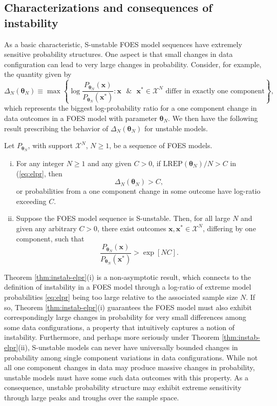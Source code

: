\documentclass[]{article}
\theoremstyle{definition}
\newcommand{\REP}{\mathrm{LREP}}
\newcommand{\DN}{\Delta_N}
\let\BeginKnitrBlock\begin \let\EndKnitrBlock\end
\begin{document}
\subsection{Characterizations and consequences of
instability}\label{characterizations-and-consequences-of-instability}

As a basic characteristic, S-unstable FOES model sequences have
extremely sensitive probability structures. One aspect is that small
changes in data configuration can lead to very large changes in
probability. Consider, for example, the quantity given by \[
\DN(\boldsymbol \theta_N) \equiv \max \left\{\log \frac{P_{\boldsymbol \theta_N}(\boldsymbol x)}{P_{\boldsymbol \theta_N}(\boldsymbol x^*)} : \boldsymbol x \text{ }\& \text{ } \boldsymbol x^* \in \mathcal{X}^N \text{ differ in exactly one component}\right\},
\] which represents the biggest log-probability ratio for a one
component change in data outcomes in a FOES model with parameter
\(\boldsymbol \theta_N\). We then have the following result prescribing
the behavior of \(\DN(\boldsymbol \theta_N)\) for unstable models.

\BeginKnitrBlock{theorem}
\protect\hypertarget{thm:instab-elpr}{}{\label{thm:instab-elpr}}Let
\(P_{\boldsymbol \theta_N}\), with support \(\mathcal{X}^N\),
\(N\geq 1\), be a sequence of FOES models.
\begin{enumerate}[(i)]
\item For any integer $N \geq 1$ and any given $C>0$, if $\REP(\boldsymbol \theta_N)/N > C$ in (\ref{eq:elpr}, then
    $$ \DN(\boldsymbol \theta_N) > C,$$
    or probabilities from a one component change in some outcome have log-ratio exceeding $C$.
\item Suppose the FOES model sequence is S-unstable. Then, for all large $N$ and given any arbitrary $C>0$, there exist outcomes $\boldsymbol x,\boldsymbol x^*\in\mathcal{X}^N$, differing by one component, such that
    $$
    \frac{P_{\boldsymbol \theta_N}(\boldsymbol x)}{P_{\boldsymbol \theta_N}(\boldsymbol x^*)} > \exp[N C].
    $$
\end{enumerate}
\EndKnitrBlock{theorem}

Theorem \ref{thm:instab-elpr}(i) is a non-asymptotic result, which
connects to the definition of instability in a FOES model through a
log-ratio of extreme model probabilities \eqref{eq:elpr} being too large
relative to the associated sample size \(N\). If so, Theorem
\ref{thm:instab-elpr}(i) guarantees the FOES model must also exhibit
correspondingly large changes in probability for very small differences
among some data configurations, a property that intuitively captures a
notion of instability. Furthermore, and perhaps more seriously under
Theorem \ref{thm:instab-elpr}(ii), S-unstable models can never have
universally bounded changes in probability among single component
variations in data configurations. While not all one component changes
in data may produce massive changes in probability, unstable models must
have some such data outcomes with this property. As a consequence,
unstable probability structure may exhibit extreme sensitivity through
large peaks and troughs over the sample space.
\end{document}
